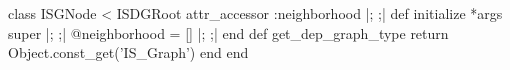 \begin{rubyblock}
class ISGNode < ISDGRoot
  attr_accessor :neighborhood |; \label{line:attr-neighborhood} ;|
  def initialize *args
    super  |; \label{line:isnode-super} ;|
    @neighborhood = [] |; \label{line:neighborhood} ;|
  end
  def get_dep_graph_type
    return Object.const_get('IS_Graph')
  end
end
\end{rubyblock}
